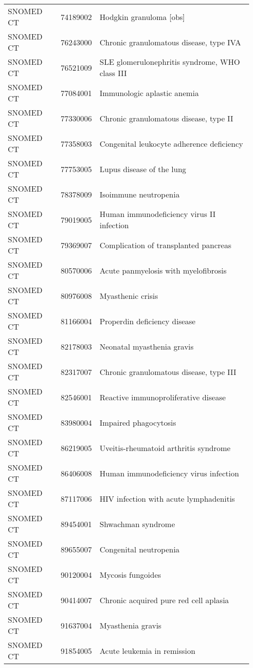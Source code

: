 \begin{longtable}{p{}p{}p{}}
  SNOMED CT & 74189002 & Hodgkin granuloma [obs] \\ 
  SNOMED CT & 76243000 & Chronic granulomatous disease, type IVA \\ 
  SNOMED CT & 76521009 & SLE glomerulonephritis syndrome, WHO class III \\ 
  SNOMED CT & 77084001 & Immunologic aplastic anemia \\ 
  SNOMED CT & 77330006 & Chronic granulomatous disease, type II \\ 
  SNOMED CT & 77358003 & Congenital leukocyte adherence deficiency \\ 
  SNOMED CT & 77753005 & Lupus disease of the lung \\ 
  SNOMED CT & 78378009 & Isoimmune neutropenia \\ 
  SNOMED CT & 79019005 & Human immunodeficiency virus II infection \\ 
  SNOMED CT & 79369007 & Complication of transplanted pancreas \\ 
  SNOMED CT & 80570006 & Acute panmyelosis with myelofibrosis \\ 
  SNOMED CT & 80976008 & Myasthenic crisis \\ 
  SNOMED CT & 81166004 & Properdin deficiency disease \\ 
  SNOMED CT & 82178003 & Neonatal myasthenia gravis \\ 
  SNOMED CT & 82317007 & Chronic granulomatous disease, type III \\ 
  SNOMED CT & 82546001 & Reactive immunoproliferative disease \\ 
  SNOMED CT & 83980004 & Impaired phagocytosis \\ 
  SNOMED CT & 86219005 & Uveitis-rheumatoid arthritis syndrome \\ 
  SNOMED CT & 86406008 & Human immunodeficiency virus infection \\ 
  SNOMED CT & 87117006 & HIV infection with acute lymphadenitis \\ 
  SNOMED CT & 89454001 & Shwachman syndrome \\ 
  SNOMED CT & 89655007 & Congenital neutropenia \\ 
  SNOMED CT & 90120004 & Mycosis fungoides \\ 
  SNOMED CT & 90414007 & Chronic acquired pure red cell aplasia \\ 
  SNOMED CT & 91637004 & Myasthenia gravis \\ 
  SNOMED CT & 91854005 & Acute leukemia in remission \\ 

\end{longtable}
